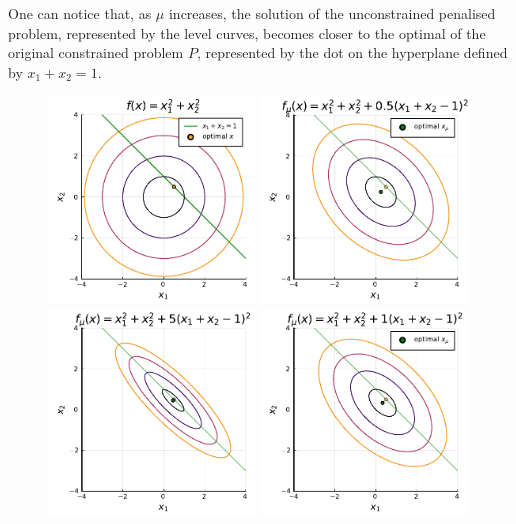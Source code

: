 One can notice that, as $\mu$ increases, the solution of the unconstrained penalised problem, represented by the level curves, becomes closer to the optimal of the original constrained problem $P$, represented by the dot on the hyperplane defined by $x_1 + x_2 = 1$.

\begin{figure}[H]
	\includegraphics[width = 0.49\textwidth]{part_2/chapter_9/figures/ex1.pdf}
	\includegraphics[width = 0.49\textwidth]{part_2/chapter_9/figures/ex2-1.pdf}
	\includegraphics[width = 0.49\textwidth]{part_2/chapter_9/figures/ex2-3.pdf}
	\includegraphics[width = 0.49\textwidth]{part_2/chapter_9/figures/ex2-2.pdf}

\end{figure}
